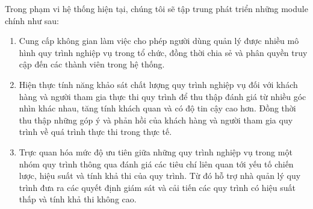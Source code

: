 Trong phạm vi hệ thống hiện tại, chúng tôi sẽ tập trung phát triển những module chính như sau:

\begin{enumerate}
    \item Cung cấp không gian làm việc cho phép người dùng quản lý được nhiều mô hình quy trình nghiệp vụ trong tổ chức, đồng thời chia sẻ và phân quyền truy cập đến các thành viên trong hệ thống.
    
    \item Hiện thực tính năng khảo sát chất lượng quy trình nghiệp vụ đối với khách hàng và người tham gia thực thi quy trình để thu thập đánh giá từ nhiều góc nhìn khác nhau, tăng tính khách quan và có độ tin cậy cao hơn. Đồng thời thu thập những góp ý và phản hồi của khách hàng và người tham gia quy trình về quá trình thực thi trong thực tế.
    
    \item Trực quan hóa mức độ ưu tiên giữa những quy trình nghiệp vụ trong một nhóm quy trình thông qua đánh giá các tiêu chí liên quan tới yếu tố chiến lược, hiệu suất và tính khả thi của quy trình. Từ đó hỗ trợ nhà quản lý quy trình đưa ra các quyết định giám sát và cải tiến các quy trình có hiệu suất thấp và tính khả thi không cao.
\end{enumerate}